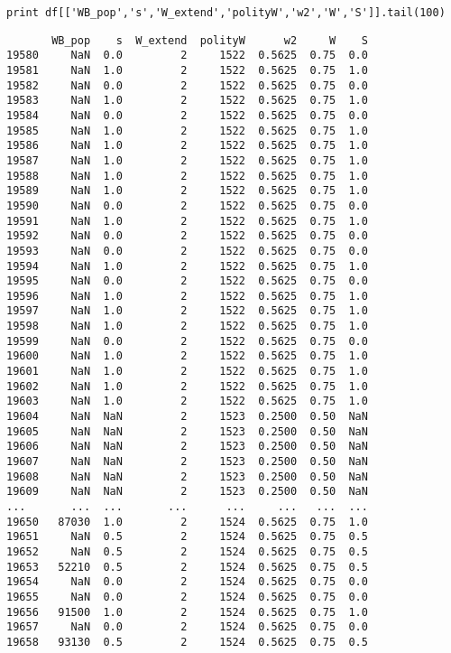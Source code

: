 \documentclass[12pt,fleqn]{article}\usepackage{common}
\begin{document}
\begin{verbatim}
print df[['WB_pop','s','W_extend','polityW','w2','W','S']].tail(100)
\end{verbatim}

\begin{verbatim}
       WB_pop    s  W_extend  polityW      w2     W    S
19580     NaN  0.0         2     1522  0.5625  0.75  0.0
19581     NaN  1.0         2     1522  0.5625  0.75  1.0
19582     NaN  0.0         2     1522  0.5625  0.75  0.0
19583     NaN  1.0         2     1522  0.5625  0.75  1.0
19584     NaN  0.0         2     1522  0.5625  0.75  0.0
19585     NaN  1.0         2     1522  0.5625  0.75  1.0
19586     NaN  1.0         2     1522  0.5625  0.75  1.0
19587     NaN  1.0         2     1522  0.5625  0.75  1.0
19588     NaN  1.0         2     1522  0.5625  0.75  1.0
19589     NaN  1.0         2     1522  0.5625  0.75  1.0
19590     NaN  0.0         2     1522  0.5625  0.75  0.0
19591     NaN  1.0         2     1522  0.5625  0.75  1.0
19592     NaN  0.0         2     1522  0.5625  0.75  0.0
19593     NaN  0.0         2     1522  0.5625  0.75  0.0
19594     NaN  1.0         2     1522  0.5625  0.75  1.0
19595     NaN  0.0         2     1522  0.5625  0.75  0.0
19596     NaN  1.0         2     1522  0.5625  0.75  1.0
19597     NaN  1.0         2     1522  0.5625  0.75  1.0
19598     NaN  1.0         2     1522  0.5625  0.75  1.0
19599     NaN  0.0         2     1522  0.5625  0.75  0.0
19600     NaN  1.0         2     1522  0.5625  0.75  1.0
19601     NaN  1.0         2     1522  0.5625  0.75  1.0
19602     NaN  1.0         2     1522  0.5625  0.75  1.0
19603     NaN  1.0         2     1522  0.5625  0.75  1.0
19604     NaN  NaN         2     1523  0.2500  0.50  NaN
19605     NaN  NaN         2     1523  0.2500  0.50  NaN
19606     NaN  NaN         2     1523  0.2500  0.50  NaN
19607     NaN  NaN         2     1523  0.2500  0.50  NaN
19608     NaN  NaN         2     1523  0.2500  0.50  NaN
19609     NaN  NaN         2     1523  0.2500  0.50  NaN
...       ...  ...       ...      ...     ...   ...  ...
19650   87030  1.0         2     1524  0.5625  0.75  1.0
19651     NaN  0.5         2     1524  0.5625  0.75  0.5
19652     NaN  0.5         2     1524  0.5625  0.75  0.5
19653   52210  0.5         2     1524  0.5625  0.75  0.5
19654     NaN  0.0         2     1524  0.5625  0.75  0.0
19655     NaN  0.0         2     1524  0.5625  0.75  0.0
19656   91500  1.0         2     1524  0.5625  0.75  1.0
19657     NaN  0.0         2     1524  0.5625  0.75  0.0
19658   93130  0.5         2     1524  0.5625  0.75  0.5

\end{verbatim}
\end{document}
